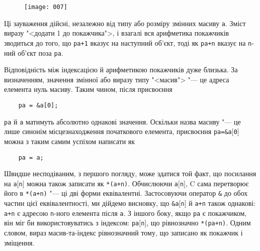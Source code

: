 \documentclass[a4paper,12pt]{book}
\begin{document}

  \begin{figure}[!htb]
  \centering
  \texttt{[image: 007]}
  \end{figure}

  Ці зауваження дійсні, незалежно від типу або розміру змінних масиву \texttt{a}. Зміст
  виразу "<додати 1 до покажчика">, і взагалі вся арифметика покажчиків
  зводиться до того, що \texttt{pa+1} вказує на наступний об'єкт, тоді як \texttt{pa+n}
  вказує на \texttt{n}-ний об'єкт поза \texttt{pa}.

  Відповідність між індексацією й арифметикою покажчиків дуже близька. За визначенням,
  значення змінної або виразу типу "<масив"> "--- це адреса елемента нуль масиву.
  Таким чином, після присвоєння
  \begin{verbatim}
    pa = &a[0];
  \end{verbatim}
  \texttt{pa} й \texttt{a} матимуть абсолютно однакові значення. Оскільки назва масиву "---
  це лише синонім місцезнаходження початкового елемента, присвоєння
  \texttt{pa=\&a\mbox{$[$}0\mbox{$]$}} можна з таким самим успіхом написати як
  \begin{verbatim}
    pa = a;
  \end{verbatim}

  Швидше несподіваним, з першого погляду, може здатися той факт, що посилання на
  \texttt{a\mbox{$[$}n\mbox{$]$}} можна також записати як \texttt{*(a+n)}. Обчислюючи
  \texttt{a\mbox{$[$}n\mbox{$]$}}, C сама перетворює його в \texttt{*(a+n)} "--- ці дві
  форми еквівалентні. Застосовуючи оператор \texttt{\&} до обох частин цієї
  еквівалентності, ми дійдемо висновку, що \texttt{\&a\mbox{$[$}n\mbox{$]$}} й
  \texttt{a+n} також однакові: \texttt{a+n} є адресою \texttt{n}-ного елемента після
  \texttt{a}. З іншого боку, якщо \texttt{pa} є покажчиком, він міг би використовуватись з
  індексом: \texttt{pa\mbox{$[$}n\mbox{$]$}}, що рівнозначно \texttt{*(pa+n)}. Одним
  словом, вираз масив-та-індекс рівнозначний тому, що записано як покажчик і зміщення.
\end{document}
